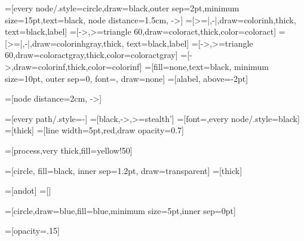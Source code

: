 =[every node/.style={circle,draw=black,outer sep=2pt,minimum
                size=15pt,text=black}, node distance=1.5cm, ->]
=[>=|,-|,draw=colorinh,thick, text=black,label]
=[->,>=triangle 60,draw=coloract,thick,color=coloract]
=[>=|,-|,draw=colorinhgray,thick, text=black,label]
=[->,>=triangle 60,draw=coloractgray,thick,color=coloractgray]
=[->,draw=colorinf,thick,color=colorinf]
=[fill=none,text=black, %
minimum size=10pt, outer sep=0, font=\scriptsize, draw=none]
=[alabel, above=-2pt]

=[node distance=2cm, ->]

=[every path/.style={-}]
=[black,->,>=stealth']
=[font=\scriptsize,every node/.style={black}]
=[thick]
=[line width=5pt,red,draw opacity=0.7]


=[process,very thick,fill=yellow!50]

=[circle, fill=black, inner sep=1.2pt, draw=transparent]
=[thick]

=[andot] %
=[] %

=[circle,draw=blue,fill=blue,minimum size=5pt,inner sep=0pt]

=[opacity=.15]
